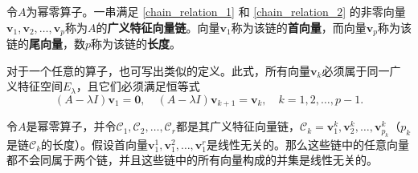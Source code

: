 \begin{definition*}
    令$A$为幂零算子。一串满足 \eqref{chain_relation_1} 和 \eqref{chain_relation_2} 的非零向量$\mathbf{v}_{1},\mathbf{v}_{2},\ldots,\mathbf{v}_{p}$称为$A$的{\bf 广义特征向量链}。向量$\mathbf{v}_1$称为该链的{\bf 首向量}，而向量$\mathbf{v}_p$称为该链的{\bf 尾向量}，数$p$称为该链的{\bf 长度}。
\end{definition*}
\begin{remark*}
    对于一个任意的算子，也可写出类似的定义。此式，所有向量$\mathbf{v}_k$必须属于同一广义特征空间$E_\lambda$，且它们必须满足恒等式
    \[(A-\lambda I)\mathbf{v}_{1}=\mathbf{0},\quad(A-\lambda I)\mathbf{v}_{k+1}=\mathbf{v}_{k},\quad k=1,2,\ldots,p-1.\]
\end{remark*}
\begin{theorem}\label{thm:cycle_li}
    令$A$是幂零算子，并令${\mathcal{C}}_{1},{\mathcal{C}}_{2},\ldots,{\mathcal{C}}_{r}$都是其广义特征向量链，$\mathcal{C}_{k}=\mathbf{v}_{1}^{k},\mathbf{v}_{2}^{k},\ldots,\mathbf{v}_{p_{k}}^{k}$（$p_k$是链${\mathcal{C}}_{k}$的长度）。假设首向量$\mathbf{v}_{1}^{1},\mathbf{v}_{1}^{2},\ldots,\mathbf{v}_{1}^{r}$是线性无关的。那么这些链中的任意向量都不会同属于两个链，并且这些链中的所有向量构成的并集是线性无关的。
\end{theorem}
